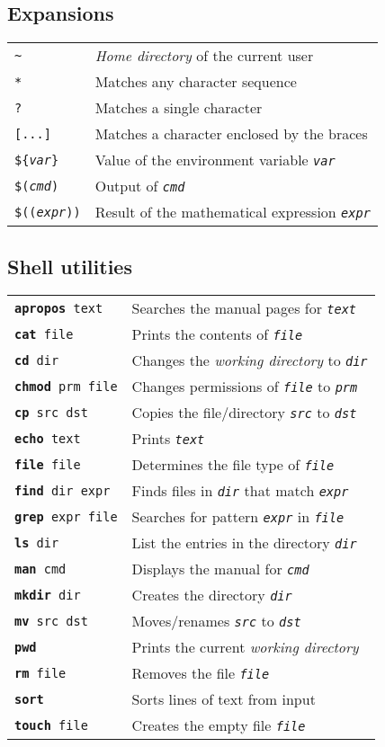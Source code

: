 \documentclass[landscape, a4paper]{article}
\newcommand{\cl}[1]{\texttt{#1}}
\newcommand{\cv}[1]{\textit{\texttt{#1}}}
\newcommand{\shcmd}[2]{\texttt{\textbf{#1} #2}}
\begin{document}
\begin{multicols*}{3}
\subsection*{Expansions}
\begin{tabular}{ll}
\cl{\textasciitilde}    & \textit{Home directory} of the current user\\
\cl{*}                  & Matches any character sequence\\
\cl{?}                  & Matches a single character\\
\cl{[...]}              & Matches a character enclosed by the braces\\
\cl{\$\{\cv{var}\cl\}}  & Value of the environment variable \cv{var}\\
\cl{\$(\cv{cmd})}       & Output of \cv{cmd}\\
\cl{\$((\cv{expr}))}    & Result of the mathematical expression \cv{expr}
\end{tabular}

\subsection*{Shell utilities}
\begin{tabular}{ll}
\shcmd{apropos}{text}       & Searches the manual pages for \cv{text}\\
\shcmd{cat}{file}           & Prints the contents of \cv{file}\\
\shcmd{cd}{dir}             & Changes the \textit{working directory} to \cv{dir}\\
\shcmd{chmod}{prm file}     & Changes permissions of \cv{file} to \cv{prm}\\
\shcmd{cp}{src dst}         & Copies the file/directory \cv{src} to \cv{dst}\\
\shcmd{echo}{text}          & Prints \cv{text}\\
\shcmd{file}{file}          & Determines the file type of \cv{file}\\
\shcmd{find}{dir expr}      & Finds files in \cv{dir} that match \cv{expr}\\
\shcmd{grep}{expr file}     & Searches for pattern \cv{expr} in \cv{file}\\
\shcmd{ls}{dir}             & List the entries in the directory \cv{dir}\\
\shcmd{man}{cmd}            & Displays the manual for \cv{cmd}\\
\shcmd{mkdir}{dir}          & Creates the directory \cv{dir}\\
\shcmd{mv}{src dst}         & Moves/renames \cv{src} to \cv{dst}\\
\shcmd{pwd}{}               & Prints the current \textit{working directory}\\
\shcmd{rm}{file}            & Removes the file \cv{file}\\
\shcmd{sort}{}              & Sorts lines of text from input\\
\shcmd{touch}{file}         & Creates the empty file \cv{file}
\end{tabular}

\end{multicols*}
\end{document}
